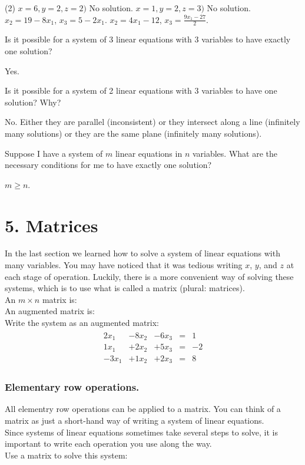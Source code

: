 \documentclass[12pt,fleqn]{book}
\newcommand{\prb}[1]{\begin{Exercise}#1\end{Exercise}}
\newcommand{\sol}[1]{\begin{Answer}#1\end{Answer}}
\begin{document}
\sol{
	\begin{tasks}(2)
		\task $x=6, y=2, z=2)$
		\task No solution.
		\task $x=1, y=2, z=3)$
		\task No solution.
		\task $x_2=19-8x_1$, $x_3=5-2x_1$.
		\task $x_2=4x_1-12$, $x_3=\frac{9x_1-27}{2}$.
	\end{tasks}
}
\clearpage
\prb{Is it possible for a system of 3 linear equations with 3 variables to have exactly one solution?}
\sol{Yes.}
\vspace{2in}
\prb{Is it possible for a system of 2 linear equations with 3 variables to have one solution?  Why?}
\sol{No.  Either they are parallel (inconsistent) or they intersect along a line (infinitely many solutions) or they are the same plane (infinitely many solutions).}
\vspace{2in}
\prb{Suppose I have a system of $m$ linear equations in $n$ variables.  What are the necessary conditions for me to have exactly one solution?}
\sol{$m\ge n$.}

\chapter{5. Matrices}
In the last section we learned how to solve a system of linear equations with many variables.  You may have noticed that it was tedious writing $x$, $y$, and $z$ at each stage of operation.  Luckily, there is a more convenient way of solving these systems, which is to use what is called a matrix (plural: matrices).
\\[1em]
An $m\times n$ matrix is:
\\[2in]
An augmented matrix is:
\\[2in]
Write the system as an augmented matrix:
\begin{align*}
	\begin{array}{rrrrr}
		2 x_{1} & - 8x_{2} & -6x_{3} & = & 1  \\
		1 x_{1} & + 2x_{2} & +5x_{3} & = & -2 \\
		-3x_{1} & + 1x_{2} & +2x_{3} & = & 8
	\end{array}
\end{align*}
\clearpage
\subsection*{Elementary row operations.}
All elementry row operations can be applied to a matrix.  You can think of a matrix as just a short-hand way of writing a system of linear equations.  \\[1em]
Since systems of linear equations sometimes take several steps to solve, it is important to write each operation you use along the way.
\\[1em]
Use a matrix to solve this system:
\end{document}
